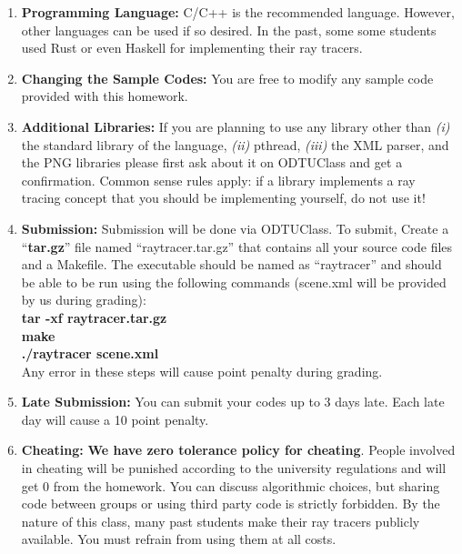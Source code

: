\documentclass[12pt]{article}
\begin{document}
\begin{enumerate}

\item \textbf{Programming Language:} C/C++ is the recommended language.
However, other languages can be used if so desired. In the past, some
some students used Rust or even Haskell for implementing their ray
tracers.

\item \textbf{Changing the Sample Codes:} You are free to modify any
sample code provided with this homework.

\item \textbf{Additional Libraries:} If you are planning to use any
library other than \textit{(i)} the standard library of the language,
\textit{(ii)} pthread, \textit{(iii)} the XML parser, and the PNG
libraries please first ask about
it on ODTUClass and get a confirmation. Common sense rules apply: if a
library implements a ray tracing concept that you should be
implementing yourself, do not use it!

\item \textbf{Submission:} Submission will be done via ODTUClass. 
To submit, Create a
``\textbf{tar.gz}''  file  named  ``raytracer.tar.gz'' that
contains all your source code files and a Makefile. The
executable should  be  named as  ``raytracer'' and  should  be
able  to  be  run  using  the following commands (scene.xml
        will be provided by us during grading):\\

\indent \textbf{tar -xf raytracer.tar.gz}\\
\indent \textbf{make}\\
\indent \textbf{./raytracer scene.xml}\\

\noindent Any error in these steps will cause point penalty during
grading.

\item \textbf{Late Submission:} You can submit your codes up to 3 days
late. Each late day will cause a 10 point penalty.

\item \textbf{Cheating:} \textbf{We have zero tolerance policy
for cheating}.  People involved in cheating will be
punished according to the university regulations and will
get 0 from the homework. You can discuss algorithmic choices,
but sharing code between groups or using third party code
is strictly forbidden. By the nature of this class, many past students
make their ray tracers publicly available. You must refrain from using
them at all costs.


\end{enumerate}
\end{document}
